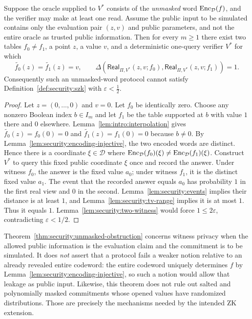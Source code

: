 \begin{theorem}\label{thm:security:unmasked-obstruction}
Suppose the oracle supplied to $V^*$ consists of the \emph{unmasked} word
$\operatorname{Enc}_\mathcal D(f)$, and the verifier may make at least one read. Assume the public input to be simulated contains only the evaluation pair $(z,v)$ and public parameters, and not the entire oracle as trusted public information.
Then for every $m\geq1$ there exist two tables $f_0\ne f_1$, a point $z$, a value $v$, and a deterministic one-query verifier $V^*$ for which
\[
 \widetilde{f_0}(z)=\widetilde{f_1}(z)=v,
 \qquad
 \Delta(\mathsf{Real}_{\Pi,V^*}(z,v;f_0),
        \mathsf{Real}_{\Pi,V^*}(z,v;f_1))=1.
\]
Consequently such an unmasked-word protocol cannot satisfy
Definition~\ref{def:security:szk} with $\varepsilon<\tfrac12$.
\end{theorem}
\begin{proof}
Let $z=(0,\ldots,0)$ and $v=0$. Let $f_0$ be identically zero. Choose any nonzero Boolean index $b\in I_m$ and let $f_1$ be the table supported at $b$ with value $1$ there and $0$ elsewhere. Lemma~\ref{lem:intro:interpolation} gives
$\widetilde{f_0}(z)=f_0(0)=0$ and
$\widetilde{f_1}(z)=f_1(0)=0$ because $b\ne0$.
By Lemma~\ref{lem:security:encoding-injective}, the two encoded words are distinct. Hence there is a coordinate $\xi\in\mathcal D$ where
$\operatorname{Enc}_\mathcal D(f_0)(\xi)\ne\operatorname{Enc}_\mathcal D(f_1)(\xi)$.
Construct $V^*$ to query this fixed public coordinate $\xi$ once and record the answer. Under witness $f_0$, the answer is the fixed value $a_0$; under witness $f_1$, it is the distinct fixed value $a_1$. The event that the recorded answer equals $a_0$ has probability $1$ in the first real view and $0$ in the second. Lemma~\ref{lem:security:events} implies their distance is at least $1$, and Lemma~\ref{lem:security:tv-range} implies it is at most $1$. Thus it equals $1$. Lemma~\ref{lem:security:two-witness} would force $1\leq2\varepsilon$, contradicting $\varepsilon<1/2$.
\end{proof}

\begin{remark}\label{rem:security:obstruction}
Theorem~\ref{thm:security:unmasked-obstruction} concerns witness privacy when the allowed public information is the evaluation claim and the commitment is to be simulated. It does \emph{not} assert that a protocol fails a weaker notion relative to an already revealed entire codeword: the entire codeword uniquely determines $f$ by Lemma~\ref{lem:security:encoding-injective}, so such a notion would allow that leakage as public input. Likewise, this theorem does not rule out salted and polynomially masked commitments whose opened values have randomized distributions. Those are precisely the mechanisms needed by the intended ZK extension.
\end{remark}

